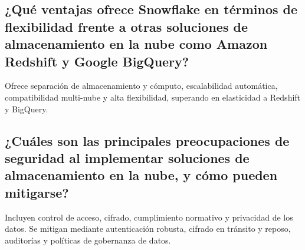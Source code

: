 \documentclass{../../../miPlantilla}
\begin{document}
\subsection{¿Qué ventajas ofrece Snowflake en términos de flexibilidad frente a otras soluciones de almacenamiento en la nube como Amazon Redshift y Google BigQuery?}

Ofrece separación de almacenamiento y cómputo, escalabilidad automática, compatibilidad multi-nube y alta flexibilidad, superando en elasticidad a
Redshift y BigQuery.

\subsection{¿Cuáles son las principales preocupaciones de seguridad al implementar soluciones de almacenamiento en la nube, y cómo pueden mitigarse?}

Incluyen control de acceso, cifrado, cumplimiento normativo y privacidad de los datos. Se mitigan mediante autenticación robusta, cifrado en tránsito y reposo,
auditorías y políticas de gobernanza de datos.
\end{document}
